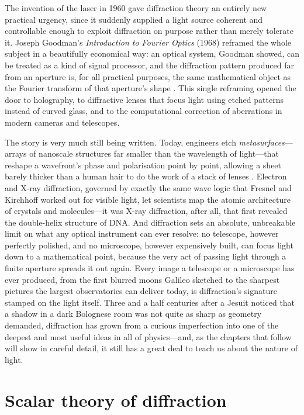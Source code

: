 	The invention of the laser in 1960 gave diffraction theory an entirely new practical urgency, since it suddenly supplied a light source coherent and controllable enough to exploit diffraction on purpose rather than merely tolerate it. Joseph Goodman's \textit{Introduction to Fourier Optics} (1968) reframed the whole subject in a beautifully economical way: an optical system, Goodman showed, can be treated as a kind of signal processor, and the diffraction pattern produced far from an aperture is, for all practical purposes, the same mathematical object as the Fourier transform of that aperture's shape \cite{goodman2005introduction}. This single reframing opened the door to holography, to diffractive lenses that focus light using etched patterns instead of curved glass, and to the computational correction of aberrations in modern cameras and telescopes.

	The story is very much still being written. Today, engineers etch \emph{metasurfaces}---arrays of nanoscale structures far smaller than the wavelength of light---that reshape a wavefront's phase and polarisation point by point, allowing a sheet barely thicker than a human hair to do the work of a stack of lenses \cite{yu2011light}. Electron and X-ray diffraction, governed by exactly the same wave logic that Fresnel and Kirchhoff worked out for visible light, let scientists map the atomic architecture of crystals and molecules---it was X-ray diffraction, after all, that first revealed the double-helix structure of DNA. And diffraction sets an absolute, unbreakable limit on what any optical instrument can ever resolve: no telescope, however perfectly polished, and no microscope, however expensively built, can focus light down to a mathematical point, because the very act of passing light through a finite aperture spreads it out again. Every image a telescope or a microscope has ever produced, from the first blurred moons Galileo sketched to the sharpest pictures the largest observatories can deliver today, is diffraction's signature stamped on the light itself. Three and a half centuries after a Jesuit noticed that a shadow in a dark Bolognese room was not quite as sharp as geometry demanded, diffraction has grown from a curious imperfection into one of the deepest and most useful ideas in all of physics---and, as the chapters that follow will show in careful detail, it still has a great deal to teach us about the nature of light.

\section{Scalar theory of diffraction}\label{Sec:Diffraction}

